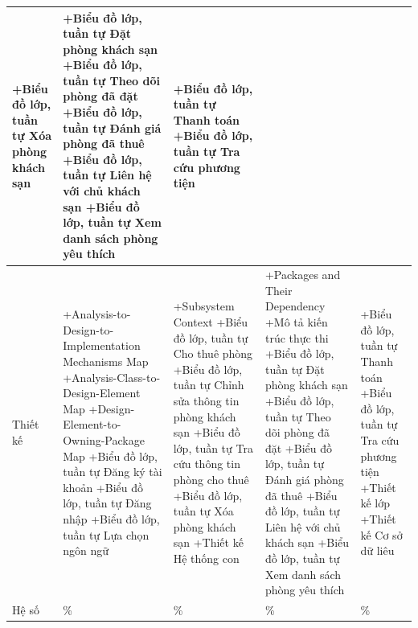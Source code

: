 \begin{longtable}{
    |p{1cm}
    |>{\raggedright\arraybackslash}p{3.5cm}
    |>{\raggedright\arraybackslash}p{3.5cm}
    |>{\raggedright\arraybackslash}p{3.5cm}
    |>{\raggedright\arraybackslash}p{3.5cm}|
}
+Biểu đồ lớp, tuần tự Xóa phòng khách sạn\newline
&+Biểu đồ lớp, tuần tự Đặt phòng khách sạn\newline
+Biểu đồ lớp, tuần tự Theo dõi phòng đã đặt\newline
+Biểu đồ lớp, tuần tự Đánh giá phòng đã thuê\newline
+Biểu đồ lớp, tuần tự Liên hệ với chủ khách sạn\newline
+Biểu đồ lớp, tuần tự Xem danh sách phòng yêu thích\newline
&+Biểu đồ lớp, tuần tự Thanh toán\newline
+Biểu đồ lớp, tuần tự  Tra cứu phương tiện\newline
\\
\hline
Thiết kế
&+Analysis-to-Design-to-Implementation Mechanisms Map\newline
+Analysis-Class-to-Design-Element Map\newline
+Design-Element-to-Owning-Package Map\newline
+Biểu đồ lớp, tuần tự Đăng ký tài khoản\newline
+Biểu đồ lớp, tuần tự Đăng nhập\newline
+Biểu đồ lớp, tuần tự Lựa chọn ngôn ngữ\newline
&+Subsystem Context\newline
+Biểu đồ lớp, tuần tự Cho thuê phòng\newline
+Biểu đồ lớp, tuần tự Chỉnh sửa thông tin phòng khách sạn\newline
+Biểu đồ lớp, tuần tự Tra cứu thông tin phòng cho thuê\newline
+Biểu đồ lớp, tuần tự Xóa phòng khách sạn\newline
+Thiết kế Hệ thống con\newline
&+Packages and Their Dependency\newline
+Mô tả kiến trúc thực thi\newline
+Biểu đồ lớp, tuần tự Đặt phòng khách sạn\newline
+Biểu đồ lớp, tuần tự Theo dõi phòng đã đặt\newline
+Biểu đồ lớp, tuần tự Đánh giá phòng đã thuê\newline
+Biểu đồ lớp, tuần tự Liên hệ với chủ khách sạn\newline
+Biểu đồ lớp, tuần tự Xem danh sách phòng yêu thích\newline
&+Biểu đồ lớp, tuần tự Thanh toán\newline
+Biểu đồ lớp, tuần tự  Tra cứu phương tiện\newline
+Thiết kế lớp\newline
+Thiết kế Cơ sở dữ liêu\newline
\\
\hline
Hệ số&25\%&25\%&25\%&25\%
\\
\hline
\end{longtable}
